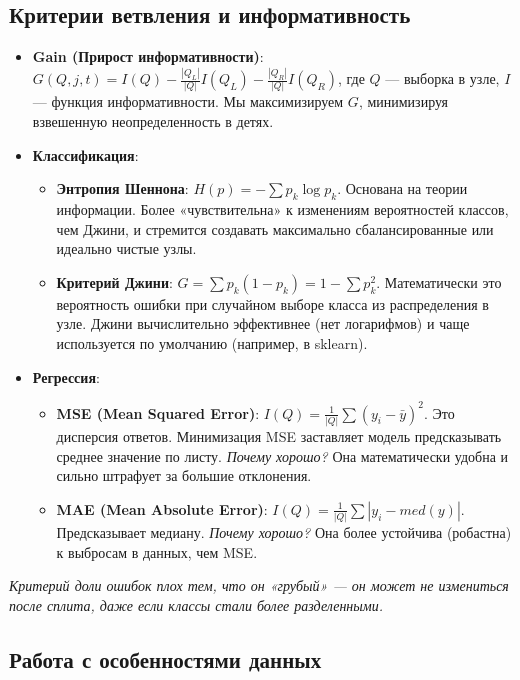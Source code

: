 \documentclass[12pt]{article}
\newcommand{\commentary}[1]{{\small\itshape\color{commentgray} #1}}
\begin{document}
\subsection{Критерии ветвления и информативность}

\begin{itemize}
    \item \textbf{Gain (Прирост информативности)}: $G(Q, j, t) = I(Q) - \frac{|Q_L|}{|Q|} I(Q_L) - \frac{|Q_R|}{|Q|} I(Q_R)$, где $Q$ — выборка в узле, $I$ — функция информативности. Мы максимизируем $G$, минимизируя взвешенную неопределенность в детях.
    
    \item \textbf{Классификация}:
    \begin{itemize}
        \item \textbf{Энтропия Шеннона}: $H(p) = -\sum p_k \log p_k$. Основана на теории информации. Более «чувствительна» к изменениям вероятностей классов, чем Джини, и стремится создавать максимально сбалансированные или идеально чистые узлы.
        \item \textbf{Критерий Джини}: $G = \sum p_k (1 - p_k) = 1 - \sum p_k^2$. Математически это вероятность ошибки при случайном выборе класса из распределения в узле. Джини вычислительно эффективнее (нет логарифмов) и чаще используется по умолчанию (например, в sklearn).
    \end{itemize}
    
    \item \textbf{Регрессия}:
    \begin{itemize}
        \item \textbf{MSE (Mean Squared Error)}: $I(Q) = \frac{1}{|Q|} \sum (y_i - \bar{y})^2$. Это дисперсия ответов. Минимизация MSE заставляет модель предсказывать среднее значение по листу. \textit{Почему хорошо?} Она математически удобна и сильно штрафует за большие отклонения.
        \item \textbf{MAE (Mean Absolute Error)}: $I(Q) = \frac{1}{|Q|} \sum |y_i - med(y)|$. Предсказывает медиану. \textit{Почему хорошо?} Она более устойчива (робастна) к выбросам в данных, чем MSE.
    \end{itemize}
\end{itemize}

\commentary{Критерий доли ошибок плох тем, что он «грубый» — он может не измениться после сплита, даже если классы стали более разделенными.}

\subsection{Работа с особенностями данных}
\end{document}
